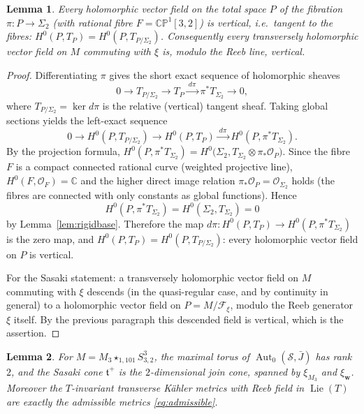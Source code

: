 \documentclass{amsart}
\newtheorem{lemma}{Lemma}
\theoremstyle{definition}
\DeclareMathOperator{\Aut}{Aut}
\DeclareMathOperator{\Lie}{Lie}
\begin{document}
\begin{lemma}\label{lem:vertical}
Every holomorphic vector field on the total space $P$ of the fibration
$\pi\colon P\to\Sigma_2$ (with rational fibre $F=\mathbb{CP}^1[3,2]$) is
vertical, i.e.\ tangent to the fibres:
$H^0(P,T_P)=H^0(P,T_{P/\Sigma_2})$. Consequently every transversely holomorphic
vector field on $M$ commuting with $\xi$ is, modulo the Reeb line, vertical.
\end{lemma}

\begin{proof}
Differentiating $\pi$ gives the short exact sequence of holomorphic sheaves
\[
  0 \longrightarrow T_{P/\Sigma_2} \longrightarrow T_P
  \xrightarrow{\ d\pi\ } \pi^*T_{\Sigma_2} \longrightarrow 0 ,
\]
where $T_{P/\Sigma_2}=\ker d\pi$ is the relative (vertical) tangent sheaf. Taking
global sections yields the left-exact sequence
\[
  0 \to H^0(P,T_{P/\Sigma_2}) \to H^0(P,T_P)
  \xrightarrow{\ d\pi\ } H^0(P,\pi^*T_{\Sigma_2}).
\]
By the projection formula,
$H^0(P,\pi^*T_{\Sigma_2})=H^0\!\bigl(\Sigma_2,T_{\Sigma_2}\otimes
\pi_*\mathcal O_P\bigr)$. Since the fibre $F$ is a compact connected rational
curve (weighted projective line), $H^0(F,\mathcal O_F)=\mathbb C$ and the higher
direct image relation $\pi_*\mathcal O_P=\mathcal O_{\Sigma_2}$ holds (the
fibres are connected with only constants as global functions). Hence
\[
  H^0(P,\pi^*T_{\Sigma_2})=H^0(\Sigma_2,T_{\Sigma_2})=0
\]
by Lemma~\ref{lem:rigidbase}. Therefore the map
$d\pi\colon H^0(P,T_P)\to H^0(P,\pi^*T_{\Sigma_2})$ is the zero map, and
$H^0(P,T_P)=H^0(P,T_{P/\Sigma_2})$: every holomorphic vector field on $P$ is
vertical.

For the Sasaki statement: a transversely holomorphic vector field on $M$
commuting with $\xi$ descends (in the quasi-regular case, and by continuity in
general) to a holomorphic vector field on $P=M/\mathcal F_\xi$, modulo the
Reeb generator $\xi$ itself. By the previous paragraph this descended field is
vertical, which is the assertion.
\end{proof}

\begin{lemma}\label{lem:cone}
For $M=M_3\star_{1,101}S^3_{3,2}$, the maximal torus of $\Aut_0(\mathcal S,\bar
J)$ has rank $2$, and the Sasaki cone $\mathfrak t^+$ is the $2$-dimensional
join cone, spanned by $\xi_{M_3}$ and $\xi_{\mathbf w}$. Moreover the
$T$-invariant transverse K\"ahler metrics with Reeb field in $\Lie(T)$ are
exactly the admissible metrics \eqref{eq:admissible}.
\end{lemma}
\end{document}
